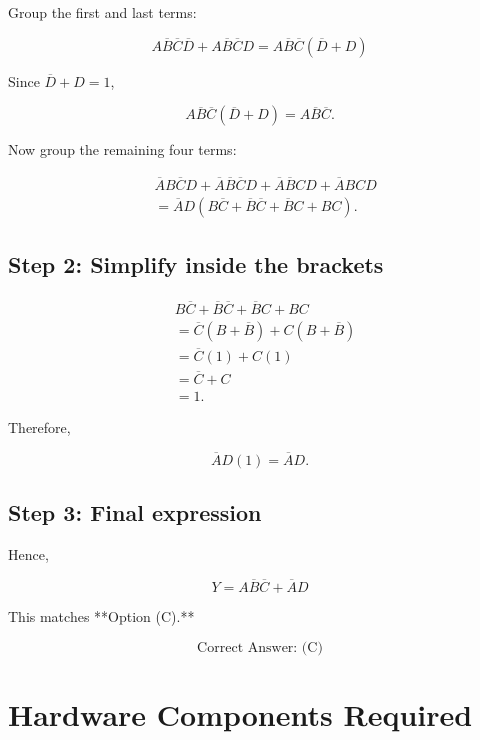 \documentclass[12pt,a4paper]{article}
\begin{document}
Group the first and last terms:

$$
A\overline{B}\overline{C}\overline{D}
+
A\overline{B}\overline{C}D
=
A\overline{B}\overline{C}
(\overline{D}+D)
$$

Since $\overline{D}+D=1$,

$$
A\overline{B}\overline{C}
(\overline{D}+D)
=
A\overline{B}\overline{C}.
$$

Now group the remaining four terms:

$$
\begin{aligned}
&
\overline{A}B\overline{C}D
+
\overline{A}\overline{B}\overline{C}D
+
\overline{A}\overline{B}CD
+
\overline{A}BCD
\\[0.2cm]
&=
\overline{A}D
\left(
B\overline{C}
+
\overline{B}\overline{C}
+
\overline{B}C
+
BC
\right).
\end{aligned}
$$

\subsection*{Step 2: Simplify inside the brackets}

$$
\begin{aligned}
&B\overline{C}
+\overline{B}\overline{C}
+\overline{B}C
+BC
\\[0.2cm]
&=
\overline{C}(B+\overline{B})
+
C(B+\overline{B})
\\[0.2cm]
&=
\overline{C}(1)
+
C(1)
\\[0.2cm]
&=
\overline{C}+C
\\[0.2cm]
&=1.
\end{aligned}
$$

Therefore,

$$
\overline{A}D(1)=\overline{A}D.
$$

\subsection*{Step 3: Final expression}

Hence,


$$
\boxed{
Y=
A\overline{B}\overline{C}
+
\overline{A}D
}
$$

This matches **Option (C).**

$$
\boxed{\text{Correct Answer: (C)}}
$$
\section*{Hardware Components Required}
\end{document}
